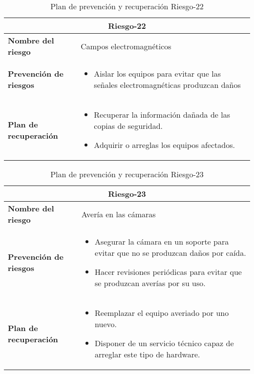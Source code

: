 \begin{table}[H]
\begin{center}
\begin{tabular}{p{} p{10cm}}
\multicolumn{2}{c}{\textbf{Riesgo-22} } \\
\hline \hline
\textbf{Nombre del riesgo} & Campos electromagnéticos \\
\hline
\textbf{Prevención de riesgos} & \begin{itemize}[-]
  \item Aislar los equipos para evitar que las señales electromagnéticas produzcan daños
  \end{itemize} \\
\hline
\textbf{Plan de recuperación} &   \begin{itemize}[-]
  \item Recuperar la información dañada de las copias de seguridad.
  \item Adquirir o arreglas los equipos afectados.
  \end{itemize}\\
\hline
\end{tabular}
\caption{Plan de prevención y recuperación Riesgo-22}
\label{tab:Riesgo-22-Prev_Recup}
\end{center}
\end{table}

\begin{table}[H]
\begin{center}
\begin{tabular}{p{} p{10cm}}
\multicolumn{2}{c}{\textbf{Riesgo-23} } \\
\hline \hline
\textbf{Nombre del riesgo} & Avería en las cámaras \\
\hline
\textbf{Prevención de riesgos} & \begin{itemize}[-]
  \item Asegurar la cámara en un soporte para evitar que no se produzcan daños por caída.
  \item Hacer revisiones periódicas para evitar que se produzcan averías por su uso.
  \end{itemize} \\
\hline
\textbf{Plan de recuperación} &   \begin{itemize}[-]
  \item Reemplazar el equipo averiado por uno nuevo.
  \item Disponer de un servicio técnico capaz de arreglar este tipo de hardware.
  \end{itemize}\\
\hline
\end{tabular}
\caption{Plan de prevención y recuperación Riesgo-23}
\label{tab:Riesgo-23-Prev_Recup}
\end{center}
\end{table}

